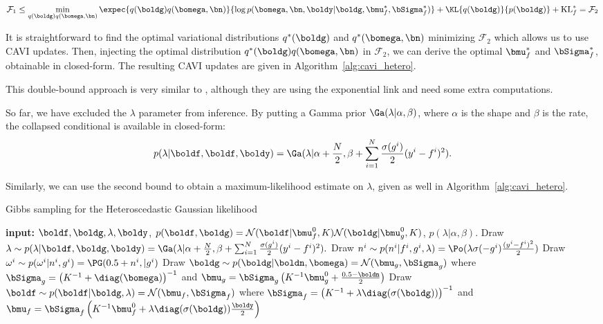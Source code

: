 \begin{align*}
    \mathcal{F}_1 \leq \min_{q(\boldg)q(\bomega,\bn)} \expec{q(\boldg)q(\bomega,\bn)}{\log p(\bomega,\bn,\boldy|\boldg,\bmu_f^*,\bSigma_f^*)} + \KL{q(\boldg)}{p(\boldg)} + \operatorname{KL}_f^*=\mathcal{F}_2
\end{align*}

It is straightforward to find the optimal variational distributions $q^*(\boldg)$ and $q^*(\bomega,\bn)$ minimizing $\mathcal{F}_2$ which allows us to use \ac{CAVI} updates.
Then, injecting the optimal distribution $q^*(\boldg)q(\bomega,\bn)$ in $\mathcal{F}_2$, we can derive the optimal $\bmu_f^*$ and $\bSigma_f^*$, obtainable in closed-form.
The resulting \ac{CAVI} updates are given in Algorithm~\ref{alg:cavi_hetero}.

This double-bound approach is very similar to \citet{lazaro2011variational}, although they are using the exponential link and need some extra computations.

So far, we have excluded the $\lambda$ parameter from inference.
By putting a Gamma prior $\Ga(\lambda|\alpha, \beta)$, where $\alpha$ is the shape and $\beta$ is the rate, the collapsed conditional is available in closed-form:
\begin{align*}
    p(\lambda|\boldf, \boldf, \boldy) = \Ga(\lambda| \alpha + \frac{N}{2}, \beta + \sum_{i=1}^N \frac{\sigma(g^i)}{2}(y^i - f^i)^2).
\end{align*}

Similarly, we can use the second bound  to obtain a maximum-likelihood estimate on $\lambda$, given as well in Algorithm~\ref{alg:cavi_hetero}.

\begin{algorithm}[H]
    \caption{Gibbs sampling for the Heteroscedastic Gaussian likelihood}
    \begin{algorithmic}
        \State \textbf{input:} $\boldf,\boldg, \lambda, \boldy$, $p(\boldf,\boldg) = \mathcal{N}(\boldf|\bmu^0_f, K)\mathcal{N}(\boldg|\bmu^0_g, K)$, $p(\lambda|\alpha,\beta)$.
            \State Draw $\lambda \sim p(\lambda|\boldf,\boldg,\boldy) = \Ga(\lambda| \alpha + \frac{N}{2}, \beta + \sum_{i=1}^N \frac{\sigma(g^i)}{2}(y^i - f^i)^2).$
            \State Draw $n^i \sim p(n^i|f^i, g^i, \lambda) = \Po(\lambda \sigma(-g^i) \frac{(y^i - f^i)^2}{2})$
            \State Draw $\omega^i \sim p(\omega^i|n^i,g^i) = \PG(0.5 + n^i, |g^i)$
            \State Draw $\boldg \sim p(\boldg|\boldn, \bomega) = \mathcal{N}(\bmu_g,\bSigma_g)$
            \State \quad where $\bSigma_g=  \left(K^{-1} + \diag(\bomega)\right)^{-1}$ and $\bmu_g = \bSigma_g\left(K^{-1}\bmu^0_g + \frac{0.5 - \boldn}{2}\right)$
            \State Draw $\boldf \sim p(\boldf | \boldg, \lambda) = \mathcal{N}(\bmu_f,\bSigma_f)$
            \State \quad where $\bSigma_f = \left(K^{-1} + \lambda\diag(\sigma(\boldg))\right)^{-1}$ and $\bmu_f = \bSigma_f\left(K^{-1}\bmu_f^0 + \lambda\diag(\sigma(\boldg))\frac{\boldy}{2}\right)$
        \EndFor
    \end{algorithmic}
    \label{alg:gibbs_hetero}
\end{algorithm}

